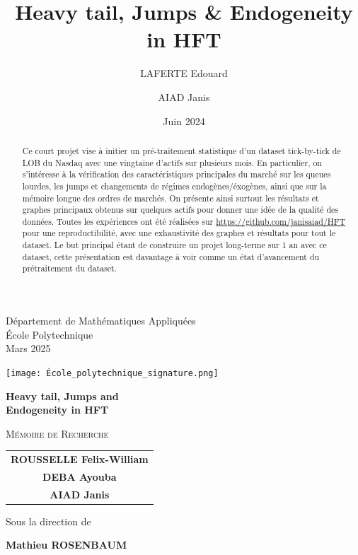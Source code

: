 \documentclass[10pt,a4paper]{article}
\title{\huge\textbf{Heavy tail, Jumps & Endogeneity in HFT}}
\author{LAFERTE Edouard \and AIAD Janis}
\date{Juin 2024}
\theoremstyle{definition}
\theoremstyle{remark}
\begin{document}
    \begin{titlepage}
        \begin{center}
            \vspace*{1cm}
            {\large Département de Mathématiques Appliquées\\
            École Polytechnique\\[0.4cm]
            Mars 2025\par}

            
                \texttt{[image: École\_polytechnique\_signature.png]}
            

            
            {\huge\bfseries Heavy tail, Jumps and \\[0.4cm] 
            Endogeneity in HFT \par}
            
            \vspace{1.0cm}
            
            {\Large\textsc{Mémoire de Recherche}\par}
            \vspace{0.8cm}
            
            {\large
            \begin{tabular}{c}
                \textbf{ROUSSELLE Felix-William}\\[0.2cm]
                \textbf{DEBA Ayouba}\\[0.2cm]
                \textbf{AIAD Janis}
            \end{tabular}\par}
            
            \vspace{0.4cm}
            
            {\large Sous la direction de\par}
            \vspace{0.4cm}
            {\large\textbf{Mathieu ROSENBAUM}\par}
            
    \vspace{0.5cm}

            \begin{minipage}{0.8\textwidth}
            \begin{abstract}
    Ce court projet vise à initier un pré-traitement statistique d'un dataset tick-by-tick de LOB du Nasdaq avec une vingtaine d'actifs sur plusieurs mois. En particulier, on s'intéresse à la vérification des caractéristiques principales du marché sur les queues lourdes, les jumps et changements de régimes endogènes/éxogènes, ainsi que 
    sur la mémoire longue des ordres de marchés.
    On présente ainsi surtout les résultats et graphes principaux obtenus sur quelques actifs pour donner une idée de la qualité des données.
    Toutes les expériences ont été réalisées sur \url{https://github.com/janisaiad/HFT} pour une reproductibilité, avec une exhaustivité des graphes et résultats pour tout le dataset.
    Le but principal étant de construire un projet long-terme sur 1 an avec ce dataset, cette présentation est davantage à voir comme un état d'avancement du prétraitement du dataset.


\end{abstract}
\end{minipage}
\end{center}
\end{titlepage}
\end{document}
